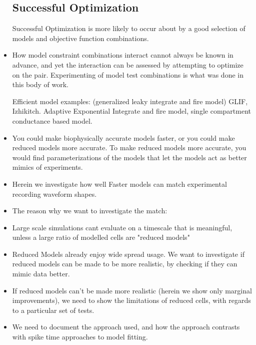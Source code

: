 \documentclass{report}
\begin{document}
\begin{itemize}
\subsection*{Successful Optimization} 
Successful Optimization is more likely to occur about by a good selection of models and objective function combinations. 
\item How model constraint combinations interact cannot always be known in advance, and yet the interaction can be assessed by attempting to optimize on the pair. Experimenting of model test combinations is what was done in this body of work.

Efficient model examples: (generalized leaky integrate and fire model) GLIF, Izhikitch. Adaptive Exponential Integrate and fire model, single compartment conductance based model. 

\item You could make biophysically accurate models faster, or you could make reduced models more accurate. To make reduced models more accurate, you would find parameterizations of the models that let the models act as better mimics of experiments.
\item Herein we investigate how well Faster models can match experimental recording waveform shapes.
\item The reason why we want to investigate the match:
\item Large scale simulations cant evaluate on a timescale that is meaningful, unless a large ratio of modelled cells are "reduced models"
\item Reduced Models already enjoy wide spread usage. We want to investigate if reduced models can be made to be more realistic, by checking if they can mimic data better.
\item If reduced models can't be made more realistic (herein we show only marginal improvements), we need to show the limitations of reduced cells, with regards to a particular set of tests.
\item We need to document the approach used, and how the approach contrasts with spike time approaches to model fitting.
\end{itemize}
\end{document}
